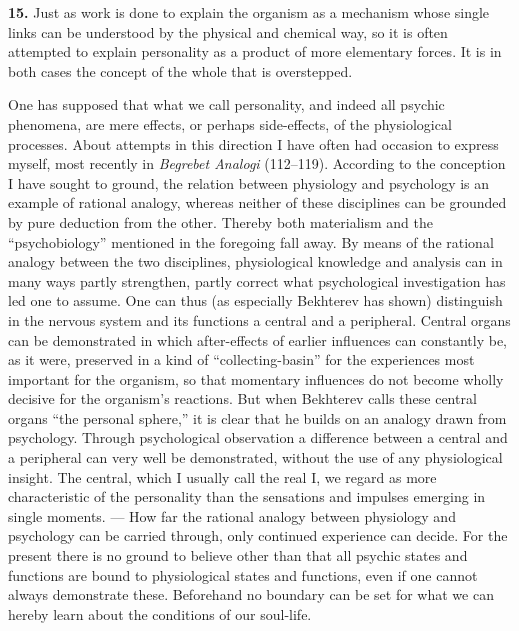\documentclass[12pt]{book}
\newcommand{\hnum}[1]{\textbf{#1.}\enspace}
\newcommand{\opage}[1]{\marginnote{\footnotesize\textit{[#1]}}}
\begin{document}
\hnum{15} Just as work is done to explain the organism as a mechanism whose single links can be
understood by the physical and chemical way, so it is often attempted to explain personality as a product
of more elementary forces. It is in both cases the concept of the whole that is overstepped.

\opage{46}One has supposed that what we call personality, and indeed all psychic phenomena, are mere effects, or
perhaps side-effects, of the physiological processes. About attempts in this direction I have often had
occasion to express myself, most recently in \textit{Begrebet Analogi} (112--119). According to the
conception I have sought to ground, the relation between physiology and psychology is an example of
rational analogy, whereas neither of these disciplines can be grounded by pure deduction from the other.
Thereby both materialism and the ``psychobiology'' mentioned in the foregoing fall away. By means of the
rational analogy between the two disciplines, physiological knowledge and analysis can in many ways partly
strengthen, partly correct what psychological investigation has led one to assume. One can thus (as
especially Bekhterev has shown) distinguish in the nervous system and its functions a central and a
peripheral. Central organs can be demonstrated in which after-effects of earlier influences can constantly
be, as it were, preserved in a kind of ``collecting-basin'' for the experiences most important for the
organism, so that momentary influences do not become wholly decisive for the organism's reactions. But
when Bekhterev calls these central organs ``the personal sphere,'' it is clear that he builds on an analogy
drawn from psychology. Through psychological observation a difference between a central and a peripheral can
very well be demonstrated, without the use of any physiological insight. The central, which I usually call
the real I, we regard as more characteristic of the personality than the sensations and impulses emerging
in single moments. --- How far the rational analogy between physiology and psychology can be carried
through, only continued experience can decide. For the present there is no ground to believe other than
\opage{47}that all psychic states and functions are bound to physiological states and functions, even if one cannot
always demonstrate these. Beforehand no boundary can be set for what we can hereby learn about the
conditions of our soul-life.
\end{document}
